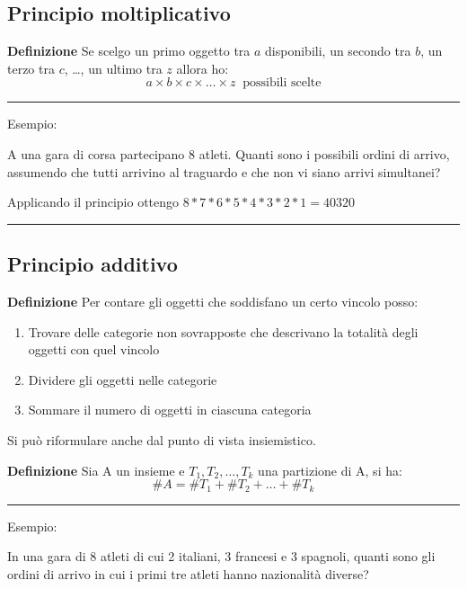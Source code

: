\documentclass{article}
\begin{document}
\subsection{Principio moltiplicativo}

\textbf{Definizione} Se scelgo un primo oggetto tra $a$ disponibili, un secondo tra $b$, un terzo tra $c$, \ldots, un ultimo tra $z$ allora ho: $$a\times b \times c \times \ldots \times z\  \text{  possibili scelte}$$

\noindent\rule{\textwidth}{0.5pt}

\noindent Esempio:\newline

\noindent A una gara di corsa partecipano 8 atleti. Quanti sono i possibili ordini di arrivo, assumendo che
tutti arrivino al traguardo e che non vi siano arrivi simultanei?\newline

\noindent Applicando il principio ottengo $8*7*6*5*4*3*2*1 = 40320$

\noindent\rule{\textwidth}{0.5pt}

\subsection{Principio additivo}

\textbf{Definizione} Per contare gli oggetti che soddisfano un certo vincolo posso:
\begin{enumerate}
    \item Trovare delle categorie non sovrapposte che descrivano la totalità degli oggetti con quel vincolo
    \item Dividere gli oggetti nelle categorie
    \item Sommare il numero di oggetti in ciascuna categoria
\end{enumerate}

\noindent Si può riformulare anche dal punto di vista insiemistico.\newline

\noindent\textbf{Definizione} Sia A un insieme e $T_1,T_2,\ldots,T_k$ una partizione di A, si ha: $$\#A = \#T_1+\#T_2+\ldots+\#T_k$$

\newpage

\noindent\rule{\textwidth}{0.5pt}

\noindent Esempio:\newline

\noindent In una gara di 8 atleti di cui 2 italiani, 3 francesi e 3 spagnoli, quanti sono gli ordini di arrivo
in cui i primi tre atleti hanno nazionalità diverse?\newline
\end{document}
